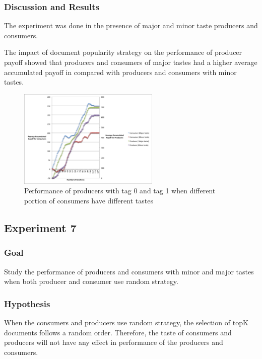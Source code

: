 \documentclass [12pt]{article} \usepackage{multicol}
\begin{document}
\subsubsection{Discussion and Results}

The experiment was done in the presence of major and minor taste producers and consumers. 

The impact of document popularity strategy on the performance of producer payoff showed that producers and consumers of major tastes  had a higher average accumulated payoff 
in compared with producers and consumers with minor tastes.  

   
\begin{figure}[h!]
\begin{center}
\includegraphics[width=0.6\textwidth,center]{images/EXP7-Doc-pop-prod-cons}
\caption{Performance of producers with tag 0 and tag 1 when different portion of consumers have different tastes}
\label{fig:images/EXP3-2}
\end{center}
\end{figure}


\subsection{Experiment 7}
\subsubsection{Goal}
Study the performance of producers and consumers with minor and major tastes when both producer and consumer use random strategy.
\subsubsection{Hypothesis}

When the consumers and producers use random strategy, the selection of topK documents follows a random order.
Therefore, the taste of consumers and producers will not have any effect in performance of the producers and consumers. 
\end{document}
